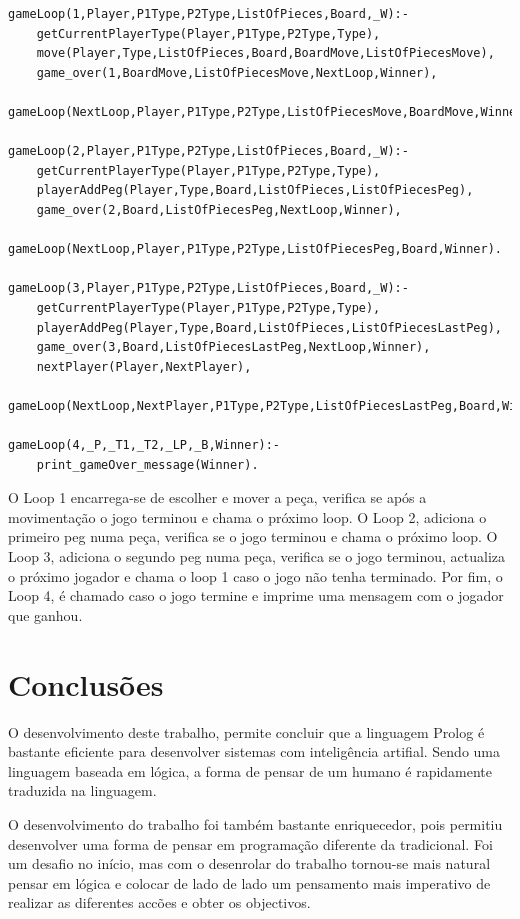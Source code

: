 \documentclass[paper=a4, fontsize=11pt]{scrartcl} %
\numberwithin{equation}{section} %
\numberwithin{figure}{section} %
\numberwithin{table}{section} %
\begin{document}
\begin{lstlisting}
gameLoop(1,Player,P1Type,P2Type,ListOfPieces,Board,_W):-
	getCurrentPlayerType(Player,P1Type,P2Type,Type),
	move(Player,Type,ListOfPieces,Board,BoardMove,ListOfPiecesMove),
	game_over(1,BoardMove,ListOfPiecesMove,NextLoop,Winner),
	gameLoop(NextLoop,Player,P1Type,P2Type,ListOfPiecesMove,BoardMove,Winner).

gameLoop(2,Player,P1Type,P2Type,ListOfPieces,Board,_W):-
	getCurrentPlayerType(Player,P1Type,P2Type,Type),
	playerAddPeg(Player,Type,Board,ListOfPieces,ListOfPiecesPeg),
	game_over(2,Board,ListOfPiecesPeg,NextLoop,Winner),
	gameLoop(NextLoop,Player,P1Type,P2Type,ListOfPiecesPeg,Board,Winner).

gameLoop(3,Player,P1Type,P2Type,ListOfPieces,Board,_W):-
	getCurrentPlayerType(Player,P1Type,P2Type,Type),
	playerAddPeg(Player,Type,Board,ListOfPieces,ListOfPiecesLastPeg),
	game_over(3,Board,ListOfPiecesLastPeg,NextLoop,Winner),
	nextPlayer(Player,NextPlayer),
	gameLoop(NextLoop,NextPlayer,P1Type,P2Type,ListOfPiecesLastPeg,Board,Winner).

gameLoop(4,_P,_T1,_T2,_LP,_B,Winner):-
	print_gameOver_message(Winner).
\end{lstlisting}

O Loop 1 encarrega-se de escolher e mover a peça, verifica se após a movimentação o jogo terminou e chama o próximo loop. O Loop 2, adiciona o primeiro peg numa peça, verifica se o jogo terminou e chama o próximo loop. O Loop 3, adiciona o segundo peg numa peça, verifica se o jogo terminou, actualiza o próximo jogador e chama o loop 1 caso o jogo não tenha terminado. Por fim, o Loop 4, é chamado caso o jogo termine e imprime uma mensagem com o jogador que ganhou.

\section{Conclusões}

O desenvolvimento deste trabalho, permite concluir que a linguagem Prolog é bastante eficiente para desenvolver sistemas com inteligência artifial. Sendo uma linguagem baseada em lógica, a forma de pensar de um humano é rapidamente traduzida na linguagem.

O desenvolvimento do trabalho foi também bastante enriquecedor, pois permitiu desenvolver uma forma de pensar em programação diferente da tradicional. Foi um desafio no início, mas com o desenrolar do trabalho tornou-se mais natural pensar em lógica e colocar de lado de lado um pensamento mais imperativo de realizar as diferentes accões e obter os objectivos.
\end{document}
